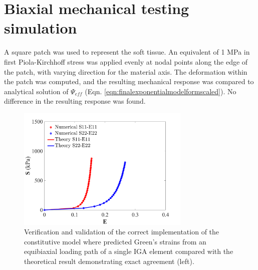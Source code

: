 \section{Biaxial mechanical testing simulation}\label{sec:biaxialsimulation}

	A square patch was used to represent the soft tissue. An equivalent of 1 MPa in first Piola-Kirchhoff stress was applied evenly at nodal points along the edge of the patch, with varying direction for the material axis. The deformation within the patch was computed, and the resulting mechanical response was compared to analytical solution of $\Psi_{eff}$ (Eqn. \ref{eqn:finalexponentialmodelformscaled}). No difference in the resulting response was found. 

\begin{figure}[!htbp]
\centering
\includegraphics[width=3.25in]{Figures/validation.png}
\caption{Verification and validation of the correct implementation of the constitutive model where predicted Green’s strains from an equibiaxial loading path of a single IGA element compared with the theoretical result demonstrating exact agreement (left).}
\label{fig:biaxvalidation}
\end{figure}
